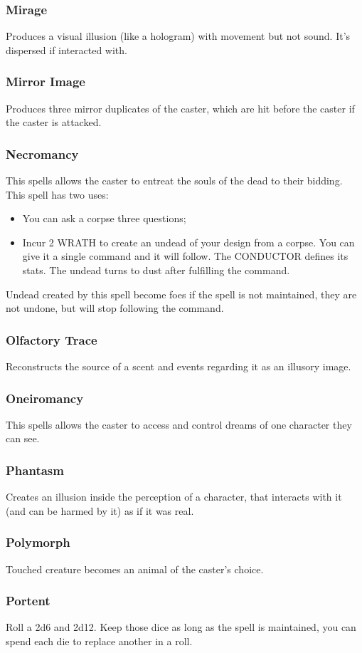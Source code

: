 \begin{multicols}{3}
\subsubsection*{Mirage}
Produces a visual illusion (like a hologram) with movement but not sound. It's dispersed if interacted with.
\subsubsection*{Mirror Image}
Produces three mirror duplicates of the caster, which are hit before the caster if the caster is attacked.
\subsubsection*{Necromancy}
This spells allows the caster to entreat the souls of the dead to their bidding. This spell has two uses:
\begin{itemize}
    \item {You can ask a corpse three questions;}
    \item {Incur 2 WRATH to create an undead of your design from a corpse. You can give it a single command and it will follow. The CONDUCTOR defines its stats. The undead turns to dust after fulfilling the command.}
\end{itemize}
Undead created by this spell become foes if the spell is not maintained, they are not undone, but will stop following the command.
\subsubsection*{Olfactory Trace}
Reconstructs the source of a scent and events regarding it as an illusory image.
\subsubsection*{Oneiromancy}
This spells allows the caster to access and control dreams of one character they can see.
\subsubsection*{Phantasm}
Creates an illusion inside the perception of a character, that interacts with it (and can be harmed by it) as if it was real.
\subsubsection*{Polymorph}
Touched creature becomes an animal of the caster's choice.
\subsubsection*{Portent}
Roll a 2d6 and 2d12. Keep those dice as long as the spell is maintained, you can spend each die to replace another in a roll.

\end{multicols}
